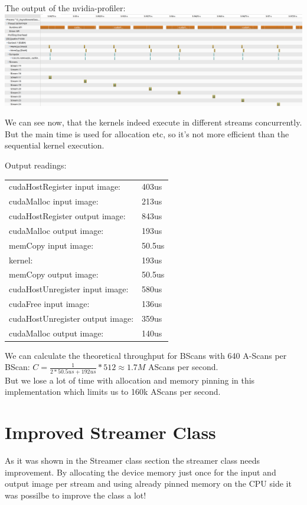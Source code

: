 The output of the nvidia-profiler:\\
\includegraphics[width=\textwidth]{imgs/StreamsSlow.png}

We can see now, that the kernels indeed execute in different streams concurrently. But the main time is used for allocation etc, so it's not more efficient than the sequential kernel execution.

Output readings:\\
\begin{tabular}{ll}
	cudaHostRegister input image: & 403us \\
	cudaMalloc input image: & 213us\\
	cudaHostRegister output image: & 843us\\
	cudaMalloc output image: & 193us\\
	memCopy input image: & 50.5us\\
	kernel: & 193us\\
	memCopy output image: & 50.5us\\
	cudaHostUnregister input image: & 580us\\
	cudaFree input image:& 136us\\
	cudaHostUnregister output image: & 359us\\
	cudaMalloc output image: & 140us\\
\end{tabular}

We can calculate the theoretical throughput for BScans with 640 A-Scans per BScan: $C = \frac{1}{2*50.5us + 192us} * 512 \approx 1.7M$ AScans per second.\\
But we lose a lot of time with allocation and memory pinning in this implementation which limits us to 160k AScans per second.
\cite[CUDA Programming Guide, chapter 3.2.5.5ff]{cudaGuide}
\pagebreak


\section{Improved Streamer Class}
As it was shown in the Streamer class section the streamer class needs improvement. By allocating the device memory just once for the input and output image per stream and using already pinned memory on the CPU side it was possilbe to improve the class a lot!


